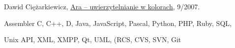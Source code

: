\documentclass[10pt]{article}
\renewcommand{\section}[2]%
        {\pagebreak[2]\vspace{1.4\baselineskip}%
         \phantomsection\addcontentsline{toc}{section}{#1}%
         \hspace{0in}%
         \marginpar{
         \raggedright \scshape #1}#2}
\renewcommand{\subsection}[2]%
        {\pagebreak[2]\vspace{0.3\baselineskip}%
         \phantomsection\addcontentsline{toc}{subsection}{#1}%
         \hspace{0in}%
         \marginpar{\scriptsize
         \raggedright \scshape #1}#2}
\newcommand{\blankline}{\quad\pagebreak[2]}
\begin{document}
%
Dawid Ciężarkiewicz,
\href{http://research.tiger.com.pl/blog_data/DigitalLib/LinuxPlus/contents.html#200709}
                         {Ara – uwierzytelnianie w kolorach},
9/2007.


\pagebreak[2]

%

\blankline

Assembler
C, C++, D, Java, JavaScript, Pascal, Python, PHP, Ruby,
SQL,

\blankline

Unix API,
XML, XMPP, Qt, UML,
(RCS, CVS, SVN, Git
\end{document}
